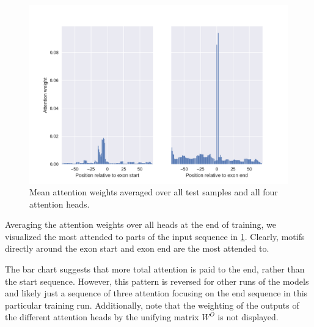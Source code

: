 \begin{figure}
	\centering\includegraphics[width=1\textwidth]{../visualizations/ch5-results/mean_attention_barchart.png} 
	\caption{Mean attention weights averaged over all test samples and all four attention heads. }
	\label{fig:mean_attn}
\end{figure}
Averaging the attention weights over all heads at the end of training, we visualized the most attended to parts of the input sequence in \ref{fig:mean_attn}.
Clearly, motifs directly around the exon start and exon end are the most attended to. 

The bar chart suggests that more total attention is paid to the end, rather than the start sequence. However, this pattern is reversed for other runs of the models and likely just a sequence of three attention focusing on the end sequence in this particular training run. Additionally, note that the weighting of the outputs of the different attention heads by the unifying matrix $W^O$ is not displayed. 


















